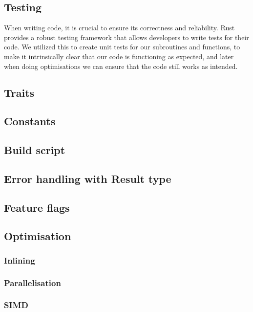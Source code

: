 \documentclass[twoside,11pt]{report}
\theoremstyle{definition}
\theoremstyle{plain}
\begin{document}
\subsection{Testing} %
When writing code, it is crucial to ensure its correctness and reliability. Rust provides a robust testing framework \cite{rustlangRustProgramming} that allows developers to write tests for their code. We utilized this to create unit tests for our subroutines and functions, to make it intrinsically clear that our code is functioning as expected, and later when doing optimisations we can ensure that the code still works as intended.

\subsection{Traits}

\subsection{Constants} %

\subsection{Build script}

\subsection{Error handling with Result type} %

\subsection{Feature flags}

\subsection{Optimisation}
\subsubsection{Inlining}
\subsubsection{Parallelisation}
\subsubsection{SIMD}
\end{document}
